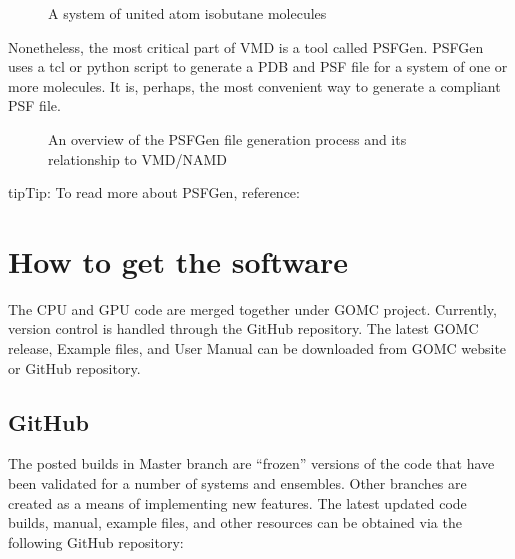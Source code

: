 \documentclass[letterpaper,10pt,english]{sphinxmanual}
\begin{document}
\begin{figure}[htbp]
\centering
\capstart

\noindent{}
\caption{A system of united atom isobutane molecules}\label{\detokenize{software_tools:id1}}\end{figure}

Nonetheless, the most critical part of VMD is a tool called PSFGen. PSFGen uses a tcl or python script to generate a PDB and PSF file for a system of one or more molecules. It is, perhaps, the most convenient way to generate a compliant PSF file.

\begin{figure}[htbp]
\centering
\capstart

\noindent{}
\caption{An overview of the PSFGen file generation process and its relationship to VMD/NAMD}\label{\detokenize{software_tools:id2}}\end{figure}

\begin{sphinxadmonition}{tip}{Tip:}
To read more about PSFGen, reference:



\end{sphinxadmonition}


\chapter{How to get the software}
\label{\detokenize{download:how-to-get-the-software}}\label{\detokenize{download::doc}}
The CPU and GPU code are merged together under GOMC project. Currently, version control is handled through the GitHub repository. The latest GOMC release, Example files, and User Manual can be downloaded from GOMC website or GitHub repository.


\section{GitHub}
\label{\detokenize{download:github}}
The posted builds in Master branch are “frozen” versions of the code that have been validated for a number of systems and ensembles. Other branches are created as a means of implementing new features. The latest updated code builds, manual, example files, and other resources can be obtained via the following GitHub repository:
\end{document}
